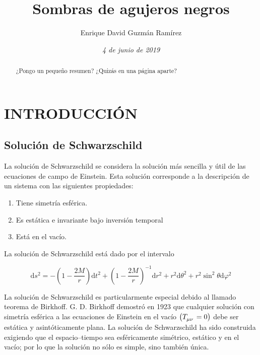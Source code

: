 \documentclass[10pt]{article}
\title{\textbf{{\Large Sombras de agujeros negros}}}
\author{Enrique David Guzmán Ramírez \vspace{-1em}}
\affil{Facultad de Ciencias, Universidad Nacional Autónoma de México \vspace{-0.5em}}
\date{\textit{{\normalsize 4 de junio de 2019}}}
\begin{document}
	
	
\maketitle
	
\vspace{-2em}
\begin{abstract}
\vspace{-1em}
¿Pongo un pequeño resumen? ¿Quizás en una página aparte?
\end{abstract}
	

\section{INTRODUCCIÓN}

\subsection{Solución de Schwarzschild}

La solución de Schwarzschild se considera la solución más sencilla y útil de las ecuaciones de campo de Einstein. Esta solución corresponde a la descripción de un sistema con las siguientes propiedades: \cite{Luminet_1979} \cite{Amarilla_2012} \cite{Amarilla_2018}

\begin{enumerate}
\item Tiene simetría esférica.
\item Es estática e invariante bajo inversión temporal
\item Está en el vacío. 
\end{enumerate}

La solución de Schwarzschild está dado por el intervalo

\begin{equation}
\text{d}s^{2} = -\left( 1 - \dfrac{2M}{r} \right)\text{d}t^{2} + \left( 1 - \dfrac{2M}{r} \right)^{-1}\text{d}r^{2}
+ r^{2}\text{d}\theta^{2} + r^{2}\sin^{2}\theta\text{d}\varphi^{2}
\label{ec:intervalo_Schwarzschild}
\end{equation}

La solución de Schwarzschild es particularmente especial debido al llamado teorema de Birkhoff. G. D. Birkhoff demostró en 1923 que cualquier solución con simetría esférica a las ecuaciones de Einstein en el vacío $ \left( \tensor{T}{_\mu_\nu} = 0 \right) $ debe ser estática y asintóticamente plana. La solución de Schwarzschild ha sido construida exigiendo que el espacio–tiempo sea esféricamente simétrico, estático y en el vacío; por lo que la solución no sólo es simple, sino también única.
\end{document}
